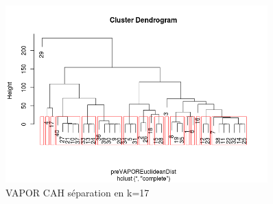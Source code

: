 \begin{figure}[H]
\centering
\includegraphics[width=0.90\textwidth]{../Fig/VAPOR/vapor-cah-k12-pre.png}
\caption{VAPOR CAH séparation en k=17 }
\end{figure}


%
%









%

